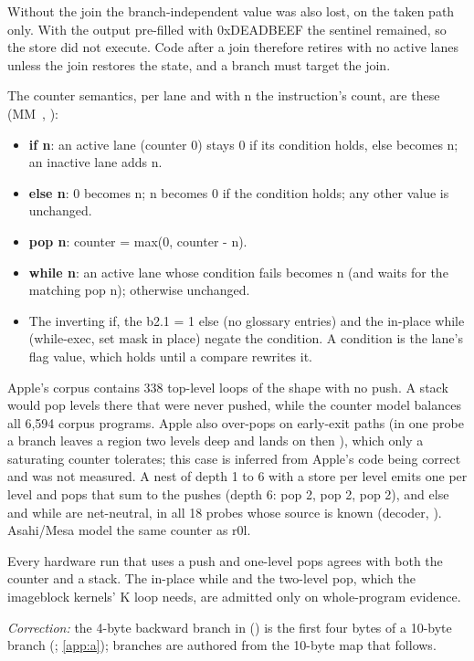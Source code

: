 Without the join the branch-independent value was also lost, on the taken path only. With the output pre-filled with
0xDEADBEEF the sentinel remained, so the store did not execute. Code after a join therefore retires with no active lanes
unless the join restores the state, and a branch must target the join.

The counter semantics, per lane and with n the instruction's count, are these (MM~,
):

\begin{itemize}
\item \textbf{if n}: an active lane (counter 0) stays 0 if its condition holds, else becomes n; an inactive lane adds n.
\item \textbf{else n}: 0 becomes n; n becomes 0 if the condition holds; any other value is unchanged.
\item \textbf{pop n}: counter = max(0, counter - n).
\item \textbf{while n}: an active lane whose condition fails becomes n (and waits for the matching pop n); otherwise unchanged.
\item The inverting if, the b2.1 = 1 else (no glossary entries) and the in-place while (while-exec, set mask in place)
  negate the condition. A condition is the lane's flag value, which holds until a compare rewrites it.
\end{itemize}

Apple's corpus contains 338 top-level loops of the shape  with no push. A stack would
pop levels there that were never pushed, while the counter model balances all 6,594 corpus programs. Apple also over-pops
on early-exit paths (in one probe a branch leaves a region two levels deep and lands on  then
), which only a saturating counter tolerates; this case is inferred from Apple's code being correct and was
not measured. A nest of depth 1 to 6 with a store per level emits one  per level and pops that sum to the
pushes (depth 6: pop 2, pop 2, pop 2), and else and while are net-neutral, in all 18 probes whose source is known (decoder,
). Asahi/Mesa model the same counter as r0l.

Every hardware run that uses a push and one-level pops agrees with both the counter and a stack. The in-place while and
the two-level pop, which the imageblock kernels' K loop needs, are admitted only on whole-program evidence.

\emph{Correction:} the 4-byte backward branch in  () is the first four bytes of a
10-byte branch (; \cref{app:a}); branches are authored from the 10-byte map that follows.


